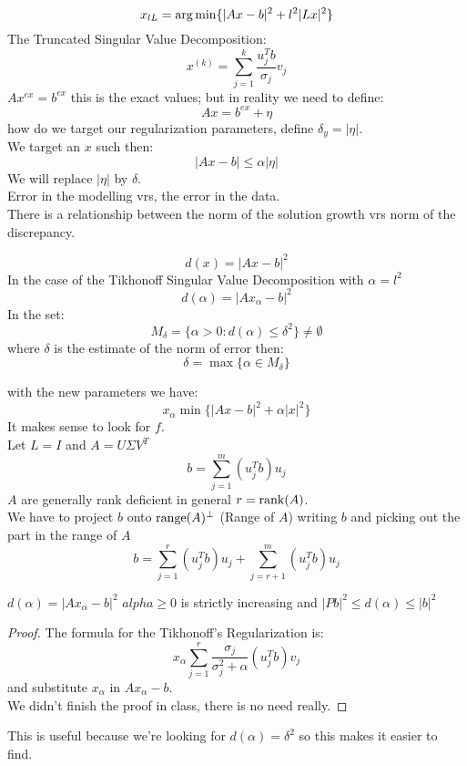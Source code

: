 $$ x_{lL} = \operatorname*{arg\,min}\{ |Ax-b|^2 + l^2|Lx|^2 \}$$
The Truncated Singular Value Decomposition:
$$x^{(k)}= \sum_{j=1}^k \frac{u_j^T b}{\sigma_j} v_j$$ 
$Ax ^{ex} = b ^{ex} $ this is the exact values; but in reality we need to define:
$$Ax = b ^{ex}  + \eta $$
how do we target our regularization parameters, define $\delta_y = |\eta|$.\\
We target an $x$ such then:
$$|Ax-b| \leq \alpha |\eta| $$
We will replace $|\eta |$ by $\delta$.\\
Error in the modelling vrs, the error in the data.\\
There is a relationship between the norm of the solution growth vrs norm of the discrepancy.
\begin{ddef}[Discrepancy]
$$ d(x) = |Ax-b|^2$$
In the case of the Tikhonoff Singular Value Decomposition with $\alpha= l^2$
$$d(\alpha) = |Ax_\alpha - b |^2$$
In the set:
$$M_\delta = \{\alpha >0 : d(\alpha) \leq \delta^2 \} \neq \emptyset$$
where $\delta$ is the estimate of the norm of error then:
$$\delta=\max\{\alpha \in M_\delta \}$$
\end{ddef}
 with the new parameters we have:
$$x_\alpha \min \{|Ax - b|^2 + \alpha|x|^2 \}$$
It makes sense to look for $f$. \\
Let $L=I$ and $A= U\Sigma V^T$
$$b=\sum_{j=1}^m (u_j^T b ) u_j$$
$A$ are generally rank deficient in general $r=\operatorname{rank}(A)$.\\
We have to project $b$ onto $\operatorname{range}(A)^\perp$ (Range of $A$) writing $b$ and picking out the part in the range of $A$
$$b=\sum_{j=1}^r (u_j^T b ) u_j +  \sum_{j=r+1}^m (u_j^T b ) u_j$$

\begin{teorema}
$d(\alpha) = |Ax_\alpha - b|^2$ $alpha \geq 0$ is strictly increasing and $|Pb|^2 \leq d(\alpha) \leq |b|^2$ 
\begin{proof}
The formula for the Tikhonoff's Regularization is:
$$x_\alpha \sum_{j=1}^r \frac{\sigma_j}{\sigma_j^2 + \alpha} (u_j^T b) v_j$$
and substitute $x_\alpha$ in $Ax_\alpha -b$.\\
We didn't finish the proof in class, there is no need really.
\end{proof}
\end{teorema}
This is useful because we're looking for $d(\alpha)=\delta^2$ so this makes it easier to find.\\


